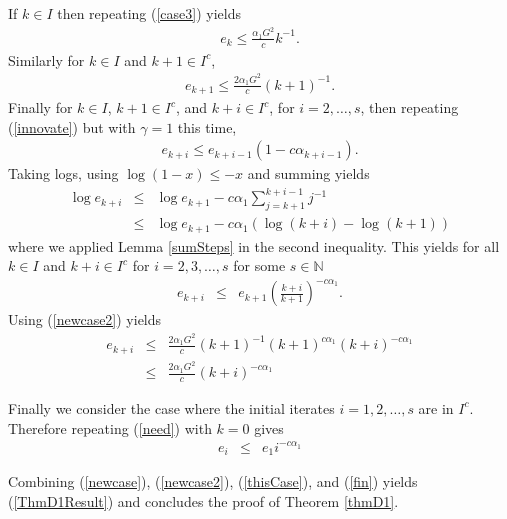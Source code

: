 If $k\in I$ then repeating (\ref{case3}) yields 
\begin{eqnarray}\label{newcase}
e_k\leq \frac{\alpha_1 G^2}{c} k^{-1}.
\end{eqnarray}
Similarly for $k\in I$ and $k+1\in I^c$, 
\begin{eqnarray}\label{newcase2}
e_{k+1}\leq \frac{2\alpha_1 G^2}{c} (k+1)^{-1}.
\end{eqnarray}
Finally for $k\in I$, $k+1\in I^c$, and $k+i\in I^c$, for $i=2,\ldots, s$, then repeating (\ref{innovate}) but with $\gamma=1$ this time,
\begin{eqnarray*}
e_{k+i}\leq e_{k+i-1}(1-c \alpha_{k+i-1}).
\end{eqnarray*}
Taking logs, using $\log(1-x)\leq -x$ and summing yields
\begin{eqnarray*}
	\log e_{k+i}
	&\leq& 
	\log e_{k+1} - c \alpha_1 \sum_{j=k+1}^{k+i-1} j^{-1}
	\\
	&\leq&
	\log e_{k+1}-c \alpha_1 \left(\log(k+i)-\log(k+1)\right)
\end{eqnarray*}
where we applied Lemma \ref{sumSteps} in the second inequality. This yields for all $k\in I$ and $k+i\in I^c$ for $i=2,3,\ldots, s$ for some $s\in \mathbb{N}$
\begin{eqnarray}
e_{k+i}&\leq& e_{k+1}\left(\frac{k+i}{k+1}\right)^{-c \alpha_1 }.
\label{need}
\end{eqnarray}
Using (\ref{newcase2}) yields 
\begin{eqnarray}
e_{k+i}&\leq&\frac{2 \alpha_1 G^2}{c} (k+1)^{-1}(k+1)^{c \alpha_1 }
(k+i)^{-c \alpha_1}
\nonumber\\
&\leq&
\frac{2 \alpha_1 G^2}{c}
(k+i)^{-c \alpha_1}
\label{thisCase}
\end{eqnarray}

Finally we consider the case where the initial iterates $i=1,2,\ldots,s$ are in $I^c$. Therefore repeating (\ref{need}) with $k=0$ gives
\begin{eqnarray}\label{fin}
e_{i}&\leq& e_{1} i^{-c \alpha_1 }
\end{eqnarray}

Combining (\ref{newcase}), (\ref{newcase2}), (\ref{thisCase}), and (\ref{fin}) yields (\ref{ThmD1Result}) and concludes the proof of Theorem \ref{thmD1}.  

